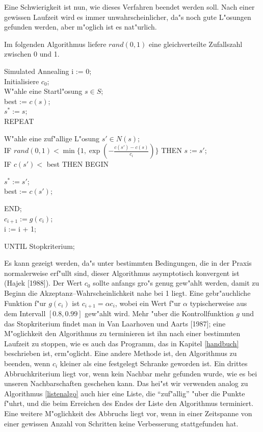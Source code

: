 Eine Schwierigkeit ist nun, wie dieses Verfahren beendet werden soll.
Nach einer gewissen Laufzeit wird es immer unwahrscheinlicher, da"s 
noch gute L"osungen gefunden werden, aber m"oglich ist es nat"urlich.

Im folgenden Algorithmus liefere $rand(0,1)$ eine gleichverteilte
Zufallszahl zwischen 0 und 1.

\begin{algorithm}{Simulated Annealing}
i := 0;\\
Initialisiere $c_0$;\\
W"ahle eine Startl"osung $s \in S$;\\
best := $c(s)$;\\
$s^* := s$;\\
{REPEAT}
\begin{Block}
	W"ahle eine zuf"allige L"osung $s' \in N(s)$;\\
	{IF} $rand(0,1) < \min \{1,\exp({\scriptstyle - \frac{c(s') - c(s)}
	{c_i}})\}$ {THEN} $s := s'$;\\
	{IF} $c(s') < $ best {THEN BEGIN}
	\begin{Block}
		$s^* := s'$;\\
		best := $c(s')$;
	\end{Block}
	{END};\\
	$c_{i+1} := g(c_i)$;\\
	i := i + 1;
\end{Block}
{UNTIL} Stopkriterium;
\end{algorithm}

Es kann gezeigt werden, da"s unter bestimmten Bedingungen, die in der
Praxis normalerweise erf"ullt sind, dieser Algorithmus asymptotisch
konvergent ist (Hajek [1988]).
Der Wert $c_0$ sollte anfangs gro"s genug gew"ahlt werden, damit zu
Beginn die Akzeptanz--Wahrscheinlichkeit nahe bei 1 liegt. Eine
gebr"auchliche Funktion f"ur $g(c_i)$ ist $c_{i+1} = \alpha c_i$,
wobei ein Wert f"ur $\alpha$ typischerweise aus dem Intervall 
$[0.8,0.99]$ gew"ahlt wird.
Mehr "uber die Kontrollfunktion $g$ und das Stopkriterium findet man in
Van Laarhoven und Aarts [1987]; eine M"oglichkeit den Algorithmus
zu terminieren ist ihn nach einer bestimmten Laufzeit zu stoppen, 
wie es auch das Programm, das in Kapitel \ref{handbuch} beschrieben
ist, erm"oglicht.
Eine andere Methode ist, den Algorithmus zu beenden, wenn $c_i$ kleiner
als eine festgelegt Schranke geworden ist.
Ein drittes Abbruchkriterium liegt vor, wenn kein Nachbar mehr gefunden wurde,
wie es bei unseren Nachbarschaften geschehen kann. Das hei"st wir
verwenden analog zu Algorithmus \ref{listenalgo} auch hier eine Liste,
die "`zuf"allig"' "uber die Punkte f"uhrt, und die beim Erreichen des 
Endes der Liste den Algorithmus terminiert.
Eine weitere M"oglichkeit des Abbruchs liegt vor, wenn in einer Zeitspanne
von einer gewissen Anzahl von Schritten keine Verbesserung stattgefunden hat.

